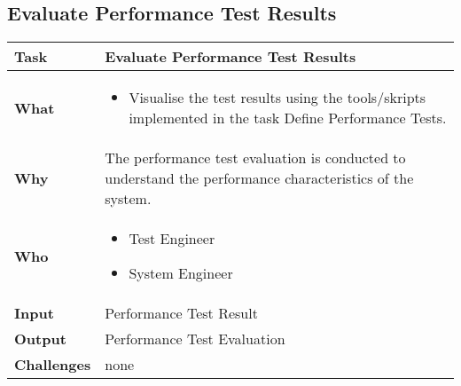 \subsection{Evaluate Performance Test Results}
\begin{minipage}{\textwidth}
 \label{table:ch6_Evaluate_Performance_Results}
\begin{tabular}
	{|m{3cm}|m{10cm}|} \hline \bfseries Task & Evaluate Performance Test Results\\
	\hline \bfseries What & 
	\begin{itemize}
		\item Visualise the test results using the tools/skripts implemented in the task Define Performance Tests.
	\end{itemize}
	\\
	\hline \bfseries Why & The performance test evaluation is conducted to understand the performance characteristics of the system.\\
	\hline \bfseries Who & 
	\begin{itemize}
		\item Test Engineer
		\item System Engineer
	\end{itemize}
	\\
	\hline \bfseries Input & Performance Test Result\\
	\hline \bfseries Output & Performance Test Evaluation\\
	\hline \bfseries Challenges & none\\
	\hline 
\end{tabular}
\end{minipage}

